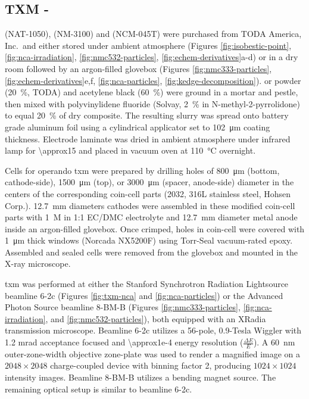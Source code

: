 \documentclass{article}
\begin{document}
\subsection*{TXM - \nmc{}}

\nca{} (NAT-1050), \nmc[333]{} (NM-3100) and \nmc[532]{} (NCM-045T)
were purchased from TODA America, Inc.\ and either stored under
ambient atmosphere (Figures \ref{fig:isobestic-point},
\ref{fig:nca-irradiation}, \ref{fig:nmc532-particles},
\ref{fig:echem-derivatives}a-d) or in a dry room followed by an
argon-filled glovebox (Figures \ref{fig:nmc333-particles},
\ref{fig:echem-derivatives}e,f, \ref{fig:nca-particles},
\ref{fig:kedge-decomposition}). \nca{} or \nmc{} powder
(\SI{20}{\percent}, TODA) and acetylene black (\SI{60}{\percent}) were
ground in a mortar and pestle, then mixed with polyvinylidene fluoride
(Solvay, \SI{2}{\percent} in N-methyl-2-pyrrolidone) to equal
\SI{20}{\percent} of dry composite. The resulting slurry was spread
onto battery grade aluminum foil using a cylindrical applicator set to
\SI{102}{\micro\meter} coating thickness. Electrode laminate was dried
in ambient atmosphere under infrared lamp for \SI{\approx15}{\min} and
placed in vacuum oven at \SI{110}{\celsius} overnight.

Cells for operando \gls{txm} were prepared by drilling holes of
\SI{800}{\micro\meter} (bottom, cathode-side), \SI{1500}{\micro\meter}
(top), or \SI{3000}{\micro\meter} (spacer, anode-side) diameter in the
centers of the corresponding coin-cell parts (2032, 316L stainless
steel, Hohsen Corp.). \SI{12.7}{\milli\meter} diameters cathodes were
assembled in these modified coin-cell parts with \SI{1}{M} 
in 1:1 EC/DMC electrolyte and \SI{12.7}{\milli\meter} diameter 
metal anode inside an argon-filled glovebox. Once crimped, holes in
coin-cell were covered with \SI{1}{\micro\meter} thick 
windows (Norcada NX5200F) using Torr-Seal vacuum-rated
epoxy. Assembled and sealed cells were removed from the glovebox and
mounted in the X-ray microscope.

\gls{txm} was performed at either the Stanford Synchrotron Radiation
Lightsource beamline 6-2c (Figures \ref{fig:txm-nca} and
\ref{fig:nca-particles}) or the Advanced Photon Source beamline 8-BM-B
(Figures \ref{fig:nmc333-particles}, \ref{fig:nca-irradiation}, and
\ref{fig:nmc532-particles}), both equipped with an XRadia transmission
microscope. Beamline 6-2c utilizes a 56-pole, 0.9-Tesla Wiggler with
1.2 mrad acceptance focused and \num{\approx1e-4} energy resolution
($\frac{\Delta E}{E}$). A \SI{60}{nm} outer-zone-width objective
zone-plate was used to render a magnified image on a $2048 \times
2048$ charge-coupled device with binning factor 2, producing $1024
\times 1024$ intensity images. Beamline 8-BM-B utilizes a bending
magnet source. The remaining optical setup is similar to beamline
6-2c.
\end{document}
